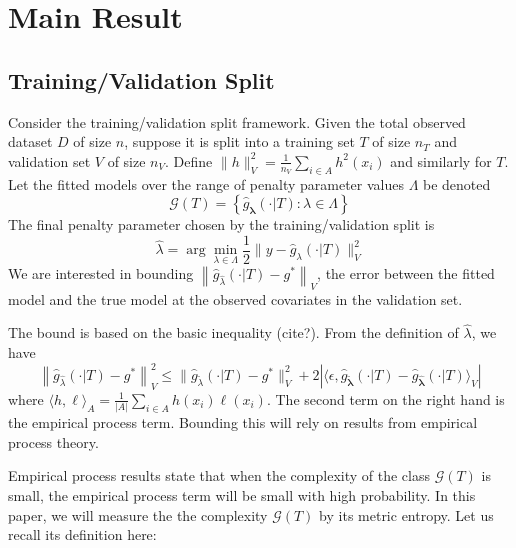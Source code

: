 \documentclass[12pt]{article}
\begin{document}
\section{Main Result} \label{sec:main_results}

\subsection{Training/Validation Split}

Consider the training/validation split framework. Given the total observed dataset $D$ of size $n$, suppose it is split into a training set $T$ of size $n_T$ and validation set $V$ of size $n_V$. Define $\| h \|_V^2 = \frac{1}{n_V}\sum_{i\in A} h^2(x_i)$ and similarly for $T$. Let the fitted models over the range of penalty parameter values $\Lambda$ be denoted
\begin{equation}
\label{function_class_GT}
\mathcal{G}(T) = \left \{ \hat{g}_{\boldsymbol \lambda}(\cdot | T) : \lambda \in \Lambda  \right \}
\end{equation}
The final penalty parameter chosen by the training/validation split is
\begin{equation}
\label{cv_lambda}
\hat{\lambda} = \arg\min_{\lambda\in\Lambda} \frac{1}{2}  \| y-\hat{g}_{\lambda}(\cdot | T) \|_{V}^{2}
\end{equation} 
We are interested in bounding $\left \|\hat{g}_{\hat{\lambda} }(\cdot | T) - g^* \right \|_V$, the error between the fitted model and the true model at the observed covariates in the validation set. 

The bound is based on the basic inequality (cite?). From the definition of $\hat{\lambda}$, we have
\begin{equation}
\label{basic_ineq}
\left \|\hat{g}_{\hat{\lambda} }(\cdot | T) - g^* \right \|_V^2
\le
\| \hat{g}_{\tilde{\lambda}}(\cdot | T) - g^*\|_V^2 + 
2 \left | \langle \epsilon, \hat{g}_{\tilde{\boldsymbol \lambda}}(\cdot | T) - \hat{g}_{\hat{\boldsymbol \lambda}}(\cdot | T) \rangle_V \right |
\end{equation}
where $\langle h, \ell \rangle_A = \frac{1}{|A|}\sum_{i\in A} h(x_i) \ell(x_i)$. The second term on the right hand is the empirical process term. Bounding this will rely on results from empirical process theory.

Empirical process results state that when the complexity of the class $\mathcal{G}(T)$ is small, the empirical process term will be small with high probability. In this paper, we will measure the the complexity $\mathcal{G}(T)$ by its metric entropy. Let us recall its definition here:
\end{document}
